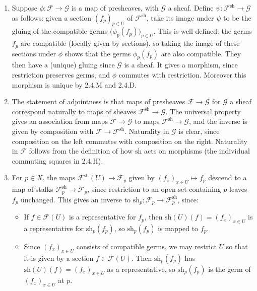 \documentclass{report}
\newcommand{\sh}{{\mathrm{sh}}} %
\newcommand{\scrF}{\mathscr{F}}
\newcommand{\scrG}{\mathscr{G}}
\begin{document}
\begin{enumerate}[label=\textbf{2.4.\Alph*.}]
	\item Suppose $\phi:\scrF\to\scrG$ is a map of presheaves, with $\scrG$ a sheaf.
	      Define $\psi:\scrF^\sh\to\scrG$ as follows: given a section $(f_p)_{p\in U}$
	      of $\scrF^\sh$, take its image under $\psi$ to be the gluing of the
	      compatible germs $\bigl(\phi_p(f_p)\bigr)_{p\in U}$. This is
	      well-defined: the germs $f_p$ are compatible (locally given by sections),
	      so taking the image of these sections under $\phi$ shows that the
	      germs $\phi_p(f_p)$ are also compatible. They then have a (unique)
	      gluing since $\scrG$ is a sheaf. It gives a morphism, since restriction
	      preserves germs, and $\phi$ commutes with restriction. Moreover this
	      morphism is unique by 2.4.M and 2.4.D.

	\item The statement of adjointness is that maps of presheaves $\scrF\to\scrG$ for
	      $\scrG$ a sheaf correspond naturally to maps of sheaves $\scrF^\sh\to\scrG$. The
	      universal property gives an association from maps $\scrF\to\scrG$ to maps
	      $\scrF^\sh\to\scrG$, and the inverse is given by composition with
	      $\scrF\to\scrF^\sh$. Naturality in $\scrG$ is clear, since composition on the
	      left commutes with composition on the right. Naturality in $\scrF$ follows
	      from the definition of how $\sh$ acts on morphisms (the individual
	      commuting squares in 2.4.H).

	\item For $p\in X$, the maps $\scrF^\sh(U)\to\scrF_p$ given by
	      $(f_x)_{x\in U}\mapsto f_p$ descend to a map of stalks $\scrF^\sh_p\to\scrF_p$,
	      since restriction to an open set containing $p$ leaves $f_p$ unchanged.
	      This gives an inverse to $\sh_p:\scrF_p\to\scrF^\sh_p$, since:
	      \begin{itemize}
		      \item If $f\in\scrF(U)$ is a representative for $f_p$, then
		            $\sh(U)(f)=(f_x)_{x\in U}$ is a representative for $\sh_p(f_p)$,
		            so $\sh_p(f_p)$ is mapped to $f_p$.

		      \item Since $(f_x)_{x\in U}$ consists of compatible germs, we may
		            restrict $U$ so that it is given by a section $f\in\scrF(U)$. Then
		            $\sh_p(f_p)$ has $\sh(U)(f)=(f_x)_{x\in U}$ as a representative,
		            so $\sh_p(f_p)$ is the germ of $(f_x)_{x\in U}$ at $p$.
	      \end{itemize}


\end{enumerate}
\end{document}
